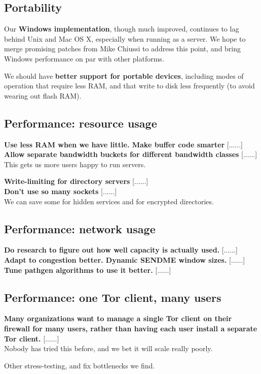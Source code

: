\documentclass{article}
\newcommand{\tmp}[1]{{\bf #1} [......] \\}
\begin{document}
\subsection{Portability}
Our {\bf Windows implementation}, though much improved, continues to lag
behind Unix and Mac OS X, especially when running as a server.  We hope to
merge promising patches from Mike Chiussi to address this point, and bring
Windows performance on par with other platforms.

We should have {\bf better support for portable devices}, including modes of
operation that require less RAM, and that write to disk less frequently (to
avoid wearing out flash RAM).

\subsection{Performance: resource usage}

\tmp{Use less RAM when we have little.  Make buffer code smarter}

\tmp{Allow separate bandwidth buckets for different bandwidth classes}  This
gets us more users happy to run servers.

\tmp{Write-limiting for directory servers}

\tmp{Don't use so many sockets} We can save some for hidden services and for
  encrypted directories.

\subsection{Performance: network usage}

\tmp{Do research to figure out how well capacity is actually used.}

\tmp{Adapt to congestion better. Dynamic SENDME window sizes.}

\tmp{Tune pathgen algorithms to use it better.}

\subsection{Performance: one Tor client, many users}

\tmp{Many organizations want to manage a single Tor client on their
firewall for many users, rather than having each user install a separate
Tor client.} Nobody has tried this before, and we bet it will scale
really poorly.

Other stress-testing, and fix bottlenecks we find.
\end{document}
